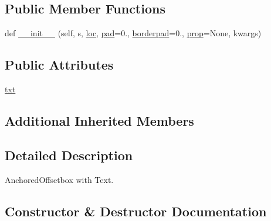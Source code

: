 \subsection*{Public Member Functions}
\begin{DoxyCompactItemize}
\item 
def \hyperlink{classmatplotlib_1_1offsetbox_1_1AnchoredText_a8fa5c5993546bd00ef30f60df5ef3ec8}{\+\_\+\+\_\+init\+\_\+\+\_\+} (self, s, \hyperlink{classmatplotlib_1_1offsetbox_1_1AnchoredOffsetbox_acff8512cc529c0576658d3d3102f68ad}{loc}, \hyperlink{classmatplotlib_1_1offsetbox_1_1AnchoredOffsetbox_a31d7295c4ca96c77f4bd5695fe094357}{pad}=0., \hyperlink{classmatplotlib_1_1offsetbox_1_1AnchoredOffsetbox_a50d24143d0fabb11a481b3d85b62a19a}{borderpad}=0., \hyperlink{classmatplotlib_1_1offsetbox_1_1AnchoredOffsetbox_aa66f860ff37b423d0cd90d61605702ef}{prop}=None, kwargs)
\end{DoxyCompactItemize}
\subsection*{Public Attributes}
\begin{DoxyCompactItemize}
\item 
\hyperlink{classmatplotlib_1_1offsetbox_1_1AnchoredText_ad0b6486a0cea0db2ee1abb3fd72d91b2}{txt}
\end{DoxyCompactItemize}
\subsection*{Additional Inherited Members}


\subsection{Detailed Description}
\begin{DoxyVerb}AnchoredOffsetbox with Text.
\end{DoxyVerb}
 

\subsection{Constructor \& Destructor Documentation}
\mbox{\label{classmatplotlib_1_1offsetbox_1_1AnchoredText_a8fa5c5993546bd00ef30f60df5ef3ec8}} 

